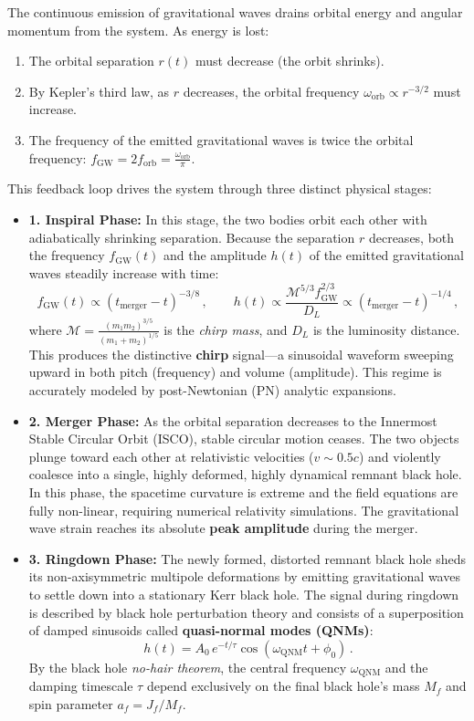 \documentclass[12pt]{article}
\newcommand{\be}{\begin{equation}}
\newcommand{\ee}{\end{equation}}
\begin{document}
The continuous emission of gravitational waves drains orbital energy and angular momentum from the system. As energy is lost:
\begin{enumerate}
    \item The orbital separation $r(t)$ must decrease (the orbit shrinks).
    \item By Kepler's third law, as $r$ decreases, the orbital frequency $\omega_{\text{orb}} \propto r^{-3/2}$ must increase.
    \item The frequency of the emitted gravitational waves is twice the orbital frequency: $f_{\text{GW}} = 2 f_{\text{orb}} = \frac{\omega_{\text{orb}}}{\pi}$.
\end{enumerate}
This feedback loop drives the system through three distinct physical stages:

\begin{itemize}
    \item \textbf{1. Inspiral Phase:}
    In this stage, the two bodies orbit each other with adiabatically shrinking separation. Because the separation $r$ decreases, both the frequency $f_{\text{GW}}(t)$ and the amplitude $h(t)$ of the emitted gravitational waves steadily increase with time:
    \be
    f_{\text{GW}}(t) \propto (t_{\text{merger}} - t)^{-3/8} \,, \qquad h(t) \propto \frac{\mathcal{M}^{5/3} f_{\text{GW}}^{2/3}}{D_L} \propto (t_{\text{merger}} - t)^{-1/4} \,,
    \ee
    where $\mathcal{M} = \frac{(m_1 m_2)^{3/5}}{(m_1 + m_2)^{1/5}}$ is the \emph{chirp mass}, and $D_L$ is the luminosity distance. This produces the distinctive \textbf{chirp} signal---a sinusoidal waveform sweeping upward in both pitch (frequency) and volume (amplitude). This regime is accurately modeled by post-Newtonian (PN) analytic expansions.

    \item \textbf{2. Merger Phase:}
    As the orbital separation decreases to the Innermost Stable Circular Orbit (ISCO), stable circular motion ceases. The two objects plunge toward each other at relativistic velocities ($v \sim 0.5c$) and violently coalesce into a single, highly deformed, highly dynamical remnant black hole. In this phase, the spacetime curvature is extreme and the field equations are fully non-linear, requiring numerical relativity simulations. The gravitational wave strain reaches its absolute \textbf{peak amplitude} during the merger.

    \item \textbf{3. Ringdown Phase:}
    The newly formed, distorted remnant black hole sheds its non-axisymmetric multipole deformations by emitting gravitational waves to settle down into a stationary Kerr black hole. The signal during ringdown is described by black hole perturbation theory and consists of a superposition of damped sinusoids called \textbf{quasi-normal modes (QNMs)}:
    \be
    h(t) = A_0 \, e^{-t/\tau} \cos(\omega_{\text{QNM}} t + \phi_0) \,.
    \ee
    By the black hole \emph{no-hair theorem}, the central frequency $\omega_{\text{QNM}}$ and the damping timescale $\tau$ depend exclusively on the final black hole's mass $M_f$ and spin parameter $a_f = J_f / M_f$.
\end{itemize}
\end{document}
